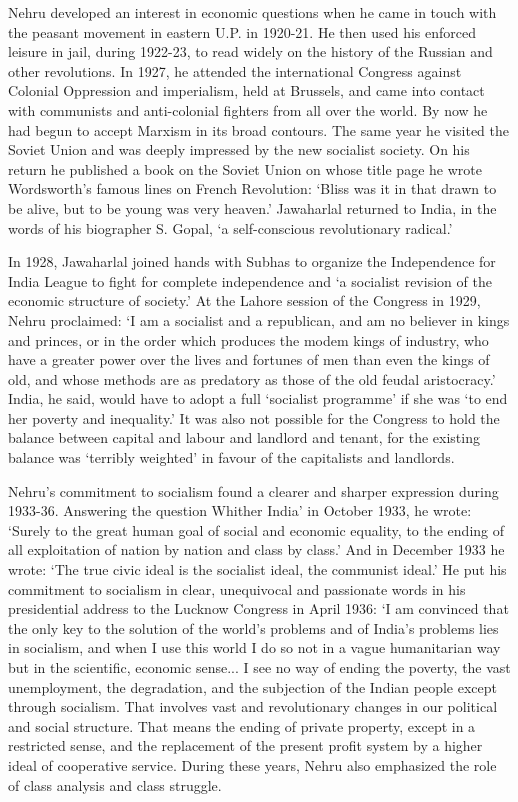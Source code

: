 Nehru developed an interest in economic questions when he came in touch with the peasant movement in eastern U.P. in 1920-21. He then used his enforced leisure in jail, during 1922-23, to read widely on the history of the Russian and other revolutions. In 1927, he attended the international Congress against Colonial Oppression and imperialism, held at Brussels, and came into contact with communists and anti-colonial fighters from all over the world. By now he had begun to accept Marxism in its broad contours. The same year he visited the Soviet Union and was deeply impressed by the new socialist society. On his return he published a book on the Soviet Union on whose title page he wrote Wordsworth's famous lines on French Revolution: `Bliss was it in that drawn to be alive, but to be young was very heaven.' Jawaharlal returned to India, in the words of his biographer S. Gopal, `a self-conscious revolutionary radical.' 

In 1928, Jawaharlal joined hands with Subhas to organize the Independence for India League to fight for complete independence and `a socialist revision of the economic structure of society.' At the Lahore session of the Congress in 1929, Nehru proclaimed: `I am a socialist and a republican, and am no believer in kings and princes, or in the order which produces the modem kings of industry, who have a greater power over the lives and fortunes of men than even the kings of old, and whose methods are as predatory as those of the old feudal aristocracy.' India, he said, would have to adopt a full `socialist programme' if she was `to end her poverty and inequality.' It was also not possible for the Congress to hold the balance between capital and labour and landlord and tenant, for the existing balance was `terribly weighted' in favour of the capitalists and landlords. 

Nehru's commitment to socialism found a clearer and sharper expression during 1933-36. Answering the question Whither India' in October 1933, he wrote: `Surely to the great human goal of social and economic equality, to the ending of all exploitation of nation by nation and class by class.' And in December 1933 he wrote: `The true civic ideal is the socialist ideal, the communist ideal.' He put his commitment to socialism in clear, unequivocal and passionate words in his presidential address to the Lucknow Congress in April 1936: `I am convinced that the only key to the solution of the world's problems and of India's problems lies in socialism, and when I use this world I do so not in a vague humanitarian way but in the scientific, economic sense... I see no way of ending the poverty, the vast unemployment, the degradation, and the subjection of the Indian people except through socialism. That involves vast and revolutionary changes in our political and social structure. That means the ending of private property, except in a restricted sense, and the replacement of the present profit system by a higher ideal of cooperative service. During these years, Nehru also emphasized the role of class analysis and class struggle. 


